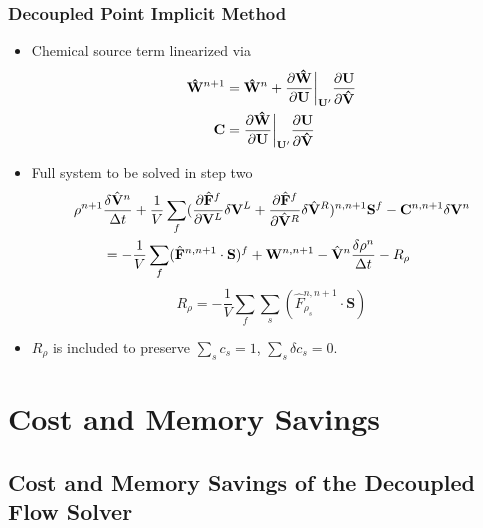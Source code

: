 \documentclass{beamer}
\begin{document}
\begin{frame}
  \frametitle{Decoupled Point Implicit Method}
  \vspace{-0.2cm}
  \begin{itemize}
    \item Chemical source term linearized via
    \vspace{-0.1cm}
    \begin{align*}
      \mathbf{\hat{W}}^{n+1} &= \mathbf{\hat{W}}^n+\frac{\partial
      \mathbf{\hat{W}}}{\partial \mathbf{U}}\bigg|_{\mathbf{U}'} \frac{\partial
      \mathbf{U}}{\partial \mathbf{\hat{V}}} \\
       \mathbf C &= \frac{\partial \mathbf{\hat{W}}}{\partial
       \mathbf{U}}\bigg|_{\mathbf{U}'} \frac{\partial \mathbf{U}}{\partial
       \mathbf{\hat{V}}}
    \end{align*}
    \item Full system to be solved in step two
    \vspace{-0.2cm}
    \begin{gather*}
      \begin{split} \rho^{n+1}&\frac{\delta \hat{\mathbf V}^n}{\Delta t}
        +\frac{1}{V}\sum\limits_{f}(\frac{\partial \hat{\mathbf F}^f}{\partial
        \mathbf V^L}\delta \mathbf V^L +\frac{\partial
        \hat{\mathbf F}^f}{\partial \hat{\mathbf V}^R}\delta
        \hat{\mathbf V}^R)^{n, n+1}\mathbf S^f - \mathbf C^{n, n+1}\delta\mathbf V^n \\ &=
        -\frac{1}{V}\sum\limits_{f}(\hat{\mathbf F}^{n,n+1}\cdot\mathbf S)^f +
        \mathbf W^{n, n+1} -\hat{\mathbf V}^n\frac{\delta \rho^n}{\Delta t} - R_\rho 
      \end{split} \\ 
    \end{gather*}
    \vspace{-1.4cm}
    \[
      R_\rho = -\frac{1}{V}\sum\limits_{f}{\sum\limits_{s}
      {(\hat{F}_{\rho_s}^{n,n+1}\cdot\mathbf{S})}}
    \]
  \item $R_\rho$ is included to preserve $\sum\limits_{s}{c_s}=1$, $\sum\limits_{s}{\delta c_s}=0$.
  \end{itemize}
\end{frame}

\section{Cost and Memory Savings}
\subsection{Cost and Memory Savings of the Decoupled Flow Solver}
\end{document}
